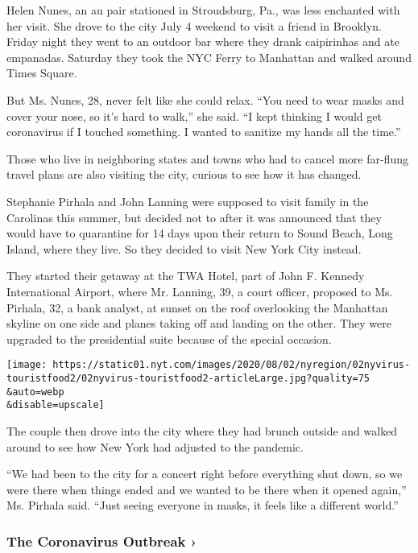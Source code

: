 Helen Nunes, an au pair stationed in Stroudsburg, Pa., was less
enchanted with her visit. She drove to the city July 4 weekend to visit
a friend in Brooklyn. Friday night they went to an outdoor bar where
they drank caipirinhas and ate empanadas. Saturday they took the NYC
Ferry to Manhattan and walked around Times Square.

But Ms. Nunes, 28, never felt like she could relax. ``You need to wear
masks and cover your nose, so it's hard to walk,'' she said. ``I kept
thinking I would get coronavirus if I touched something. I wanted to
sanitize my hands all the time.''

Those who live in neighboring states and towns who had to cancel more
far-flung travel plans are also visiting the city, curious to see how it
has changed.

Stephanie Pirhala and John Lanning were supposed to visit family in the
Carolinas this summer, but decided not to after it was announced that
they would have to quarantine for 14 days upon their return to Sound
Beach, Long Island, where they live. So they decided to visit New York
City instead.

They started their getaway at the TWA Hotel, part of John F. Kennedy
International Airport, where Mr. Lanning, 39, a court officer, proposed
to Ms. Pirhala, 32, a bank analyst, at sunset on the roof overlooking
the Manhattan skyline on one side and planes taking off and landing on
the other. They were upgraded to the presidential suite because of the
special occasion.

\texttt{[image: https://static01.nyt.com/images/2020/08/02/nyregion/02nyvirus-touristfood2/02nyvirus-touristfood2-articleLarge.jpg?quality=75\\\&auto=webp\\\&disable=upscale]}

The couple then drove into the city where they had brunch outside and
walked around to see how New York had adjusted to the pandemic.

``We had been to the city for a concert right before everything shut
down, so we were there when things ended and we wanted to be there when
it opened again,'' Ms. Pirhala said. ``Just seeing everyone in masks, it
feels like a different world.''

\href{https://www.nytimes.com/news-event/coronavirus?action=click\&pgtype=Article\&state=default\&region=MAIN_CONTENT_3\&context=storylines_faq}{}

\hypertarget{the-coronavirus-outbreak-}{%
\subsubsection{The Coronavirus Outbreak
›}\label{the-coronavirus-outbreak-}}

